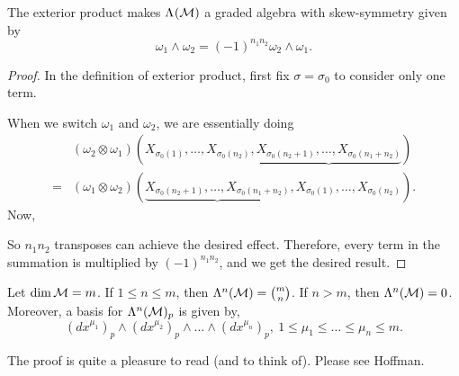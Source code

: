 \documentclass[../main.tex]{subfiles}
\begin{document}
    \begin{theorem}\label{thm:skew-symmetry-exterior-product}
        The exterior product makes \(\form{}{M}\) a graded algebra with 
        skew-symmetry given by 
        \[
        \omega_1 \wedge \omega_2 = (-1)^{n_1n_2}\omega_2 \wedge \omega_1.
        \]
    \end{theorem}
    \begin{proof}
        In the definition of exterior product, first fix \(\sigma = \sigma_0\) 
        to consider only one term. \par
        When we switch \(\omega_1\) and \(\omega_2\), we are essentially doing 
        \begin{align*}
            &(\omega_2 \otimes \omega_1)
            (X_{\sigma_0(1)}, \dots, X_{\sigma_0(n_2)}, \underbrace{X_{\sigma_0(n_2+1)}, 
            \dots, X_{\sigma_0(n_1+n_2)}}) \\
            =&(\omega_1 \otimes \omega_2)
            (\underbrace{X_{\sigma_0(n_2+1)}, \dots, X_{\sigma_0(n_1+n_2)}}, X_{\sigma_0(1)}, 
            \dots, X_{\sigma_0(n_2)}).
        \end{align*}
        Now, \par
        \begin{center}
        \end{center}
        \par
        So \(n_1n_2\) transposes can achieve the desired effect. Therefore, 
        every term in the summation is multiplied by \((-1)^{n_1n_2}\), and 
        we get the desired result.
    \end{proof}
    \begin{theorem}\label{thm:n-form-dimension}
        Let \(\dim \manifold[M]=m\). If \(1 \leq n \leq m\), then \(\form{n}{M}
        = \binom{m}{n}\). If \(n > m\), then \(\form{n}{M}=0\).\\
        Moreover, a basis for \(\form{n}{M}_p\) is given by, 
        \[
        (dx^{\mu_1})_p \wedge (dx^{\mu_2})_p \wedge \dots \wedge 
        (dx^{\mu_n})_p, ~1 \leq \mu_1 \leq \dots \leq \mu_n \leq m.
        \]
    \end{theorem}
    \begin{remark}
        The proof is quite a pleasure to read (and to think of). Please see 
        Hoffman.
    \end{remark}
\end{document}
